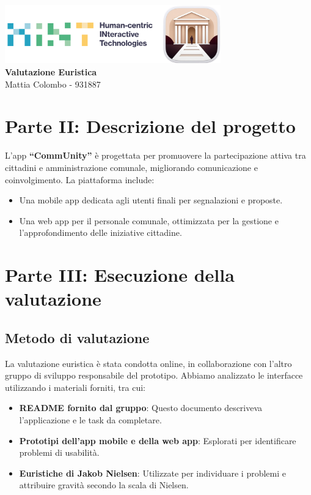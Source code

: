 \documentclass[a4paper,12pt]{article}
\begin{document}
\begin{center}
    \includegraphics[width=0.7\textwidth]{../../assets/HINT+Logo.png}\\[2em]
    {\huge \textbf{Valutazione Euristica}}\\[1em]
    {\large Mattia Colombo - 931887}
\end{center}



\section*{Parte II: Descrizione del progetto}
L’app \textbf{“CommUnity”} è progettata per promuovere la partecipazione attiva tra cittadini e amministrazione comunale, migliorando comunicazione e coinvolgimento. La piattaforma include:
\begin{itemize}
    \item Una mobile app dedicata agli utenti finali per segnalazioni e proposte.
    \item Una web app per il personale comunale, ottimizzata per la gestione e l’approfondimento delle iniziative cittadine.
\end{itemize}

\section*{Parte III: Esecuzione della valutazione}
\subsection*{Metodo di valutazione}
La valutazione euristica è stata condotta online, in collaborazione con l’altro gruppo di sviluppo responsabile del prototipo. Abbiamo analizzato le interfacce utilizzando i materiali forniti, tra cui:
\begin{itemize}
    \item \textbf{README fornito dal gruppo}: Questo documento descriveva l’applicazione e le task da completare.
    \item \textbf{Prototipi dell’app mobile e della web app}: Esplorati per identificare problemi di usabilità.
    \item \textbf{Euristiche di Jakob Nielsen}: Utilizzate per individuare i problemi e attribuire gravità secondo la scala di Nielsen.
\end{itemize}
\end{document}
